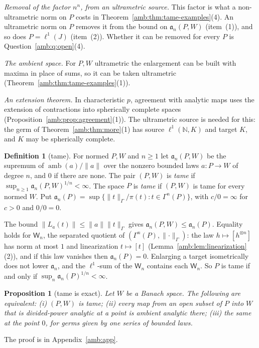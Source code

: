 \documentclass[11pt]{amsart}
\newtheorem{proposition}[theorem]{Proposition}
\theoremstyle{definition}
\newtheorem{definition}[theorem]{Definition}
\theoremstyle{remark}
\numberwithin{equation}{section}
\newcommand{\N}{\mathbb N}
\newcommand{\norm}[1]{\lVert #1\rVert}
\theoremstyle{plain}
\theoremstyle{definition}
\theoremstyle{plain}
\begin{document}
\emph{Removal of the factor $n^n$, from an ultrametric source.} This factor is what a non-ultrametric norm on $P$ costs in Theorem~\ref{amb:thm:tame-examples}(4). An ultrametric norm on $P$ removes it from the bound on $\mathfrak a_n(P,W)$ (item~(1)), and so does $P=\ell^1(J)$ (item~(2)). Whether it can be removed for every $P$ is Question~\ref{amb:q:open}(4).

\emph{The ambient space.} For $P,W$ ultrametric the enlargement can be built with maxima in place of sums, so it can be taken ultrametric (Theorem~\ref{amb:thm:tame-examples}(1)).

\emph{An extension theorem.} In characteristic $p$, agreement with analytic maps uses the extension of contractions into spherically complete spaces (Proposition~\ref{amb:prop:agreement}(1)). The ultrametric source is needed for this: the germ of Theorem~\ref{amb:thm:more}(1) has source $\ell^1(\N,K)$ and target $K$, and $K$ may be spherically complete.

\begin{definition}[tame]\label{amb:def:tame}
For normed $P,W$ and $n\ge1$ let $\mathfrak a_n(P,W)$ be the supremum of $\operatorname{amb}(a)/\norm a$ over the nonzero bounded laws $a\colon P\to W$ of degree $n$, and $0$ if there are none. The pair $(P,W)$ is \emph{tame} if $\sup_{n\ge1}\mathfrak a_n(P,W)^{1/n}<\infty$. The space $P$ is \emph{tame} if $(P,W)$ is tame for every normed $W$. Put $\mathfrak a_n(P)=\sup\{\norm t_\Gamma/\pi(t):t\in\Gamma^n(P)\}$, with $c/0=\infty$ for $c>0$ and $0/0=0$.
\end{definition}

The bound $\norm{L_a(t)}\le\norm a\norm t_\Gamma$ gives $\mathfrak a_n(P,W)\le\mathfrak a_n(P)$. Equality holds for $\mathsf W_n$, the separated quotient of $(\Gamma^n(P),\norm\cdot_\Gamma)$: the law $h\mapsto[h^{\otimes n}]$ has norm at most $1$ and linearization $t\mapsto[t]$ (Lemma~\ref{amb:lem:linearization}(2)), and if this law vanishes then $\mathfrak a_n(P)=0$. Enlarging a target isometrically does not lower $\mathfrak a_n$, and the $\ell^1$-sum of the $\mathsf W_n$ contains each $\mathsf W_n$. So $P$ is tame if and only if $\sup_n\mathfrak a_n(P)^{1/n}<\infty$.

\begin{proposition}[tame is exact]\label{amb:prop:tame-exact}
Let $W$ be a Banach space. The following are equivalent: (i) $(P,W)$ is tame; (ii) every map from an open subset of $P$ into $W$ that is divided-power analytic at a point is ambient analytic there; (iii) the same at the point $0$, for germs given by one series of bounded laws.
\end{proposition}
The proof is in Appendix~\ref{amb:app}.
\end{document}
